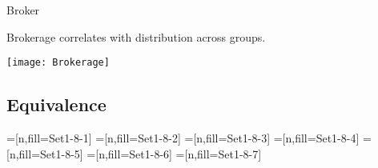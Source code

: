 \documentclass[hide notes,compress]{beamer}
\begin{document}
\begin{frame}[t]{Broker}
  \begin{overlayarea}{\linewidth}{5mm}
    Brokerage correlates with distribution across groups.
  \end{overlayarea}
  \begin{overlayarea}{\linewidth}{\textheight}
    \centering
    \texttt{[image: Brokerage]}
  \end{overlayarea}
\end{frame}

\subsection{Equivalence}

=[n,fill=Set1-8-1]
=[n,fill=Set1-8-2]
=[n,fill=Set1-8-3]
=[n,fill=Set1-8-4]
=[n,fill=Set1-8-5]
=[n,fill=Set1-8-6]
=[n,fill=Set1-8-7]
\end{document}
